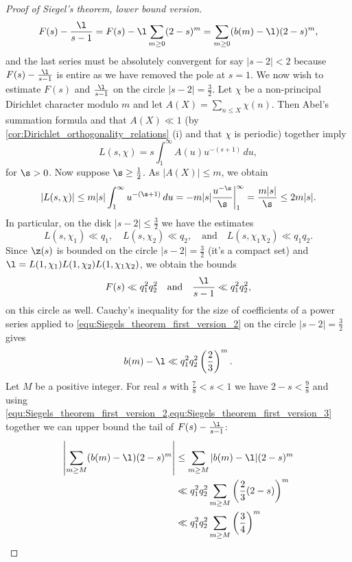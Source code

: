 \begin{proof}[Proof of Siegel's theorem, lower bound version]
\begin{equation}
          F(s)-\frac{\l}{s-1} = F(s)-\l\sum_{m \ge 0}(2-s)^{m} = \sum_{m \ge 0}(b(m)-\l)(2-s)^{m},
        \end{equation}
        and the last series must be absolutely convergent for say $|s-2| < 2$ because $F(s)-\frac{\l}{s-1}$ is entire as we have removed the pole at $s = 1$. We now wish to estimate $F(s)$ and $\frac{\l}{s-1}$ on the circle $|s-2| = \frac{3}{2}$. Let $\chi$ be a non-principal Dirichlet character modulo $m$ and let $A(X) = \sum_{n \le X}\chi(n)$. Then Abel's summation formula and that $A(X) \ll 1$ (by \cref{cor:Dirichlet_orthogonality_relations} (i) and that $\chi$ is periodic) together imply
        \[
          L(s,\chi) = s\int_{1}^{\infty}A(u)u^{-(s+1)}\,du,
        \]
        for $\s > 0$. Now suppose $\s \ge \frac{1}{2}$. As $|A(X)| \le m$, we obtain
        \[
          |L(s,\chi)| \le m|s|\int_{1}^{\infty}u^{-(\s+1)}\,du = -m|s|\frac{u^{-\s}}{\s}\bigg|_{1}^{\infty} = \frac{m|s|}{\s} \le 2m|s|.
        \]
        In particular, on the disk $|s-2| \le \frac{3}{2}$ we have the estimates
        \[
          L(s,\chi_{1}) \ll q_{1}, \quad L(s,\chi_{2}) \ll q_{2}, \quad \text{and} \quad L(s,\chi_{1}\chi_{2}) \ll q_{1}q_{2}.
        \]
        Since $\z(s)$ is bounded on the circle $|s-2| = \frac{3}{2}$ (it's a compact set) and $\l = L(1,\chi_{1})L(1,\chi_{2})L(1,\chi_{1}\chi_{2})$, we obtain the bounds
        \[
          F(s) \ll q_{1}^{2}q_{2}^{2} \quad \text{and} \quad \frac{\l}{s-1} \ll q_{1}^{2}q_{2}^{2},
        \]
        on this circle as well. Cauchy's inequality for the size of coefficients of a power series applied to \cref{equ:Siegels_theorem_first_version_2} on the circle $|s-2| = \frac{3}{2}$ gives
        \begin{equation}\label{equ:Siegels_theorem_first_version_3}
          b(m)-\l \ll q_{1}^{2}q_{2}^{2}\left(\frac{2}{3}\right)^{m}.
        \end{equation}
        Let $M$ be a positive integer. For real $s$ with $\frac{7}{8} < s < 1$ we have $2-s < \frac{9}{8}$ and using \cref{equ:Siegels_theorem_first_version_2,equ:Siegels_theorem_first_version_3} together we can upper bound the tail of $F(s)-\frac{\l}{s-1}$:
        \begin{align*}
          \left|\sum_{m \ge M}(b(m)-\l)(2-s)^{m}\right| &\le \sum_{m \ge M}|b(m)-\l|(2-s)^{m} \\
          &\ll q_{1}^{2}q_{2}^{2}\sum_{m \ge M}\left(\frac{2}{3}(2-s)\right)^{m} \\
          &\ll q_{1}^{2}q_{2}^{2}\sum_{m \ge M}\left(\frac{3}{4}\right)^{m} \\

\end{align*}
\end{proof}
